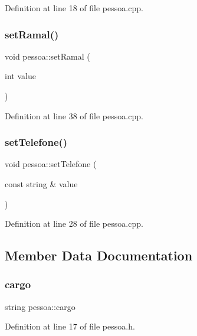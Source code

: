 Definition at line 18 of file pessoa.\+cpp.

\hypertarget{classpessoa_a4e6fa1b22e8824e270fd2aee4c9866e7}{}\label{classpessoa_a4e6fa1b22e8824e270fd2aee4c9866e7} 
\subsubsection{\texorpdfstring{set\+Ramal()}{setRamal()}}
{\footnotesize\ttfamily void pessoa\+::set\+Ramal (\begin{DoxyParamCaption}\item[{int}]{value }\end{DoxyParamCaption})}



Definition at line 38 of file pessoa.\+cpp.

\hypertarget{classpessoa_ae407991762018bfd08cf3f3d52262071}{}\label{classpessoa_ae407991762018bfd08cf3f3d52262071} 
\subsubsection{\texorpdfstring{set\+Telefone()}{setTelefone()}}
{\footnotesize\ttfamily void pessoa\+::set\+Telefone (\begin{DoxyParamCaption}\item[{const string \&}]{value }\end{DoxyParamCaption})}



Definition at line 28 of file pessoa.\+cpp.



\subsection{Member Data Documentation}
\hypertarget{classpessoa_a32474b998586278afec16302178c2856}{}\label{classpessoa_a32474b998586278afec16302178c2856} 
\subsubsection{\texorpdfstring{cargo}{cargo}}
{\footnotesize\ttfamily string pessoa\+::cargo}



Definition at line 17 of file pessoa.\+h.

